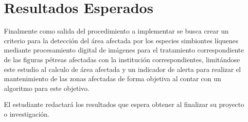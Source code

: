 \chapter{Resultados Esperados}

Finalmente como salida del procedimiento a implementar se busca crear un criterio para la detección del área afectada por los especies simbiontes líquenes mediante procesamiento digital de imágenes para el tratamiento correspondiente de las figuras pétreas afectadas con la institución correspondientes, limitándose este estudio al calculo de área afectada y un indicador de alerta para realizar el mantenimiento de las zonas afectadas de forma objetiva al contar con un algoritmo para este objetivo.

El estudiante redactará los resultados que espera obtener al finalizar su proyecto o investigación.

